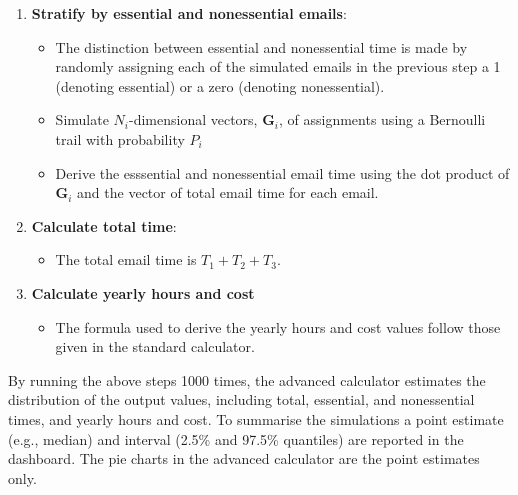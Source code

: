\documentclass[
  reportpaper,
  DIV=11,
  numbers=noendperiod]{scrartcl}
\providecommand{\tightlist}{%
  \setlength{\itemsep}{0pt}\setlength{\parskip}{0pt}}\usepackage{longtable,booktabs,array}
\begin{document}
\begin{enumerate}
\def\labelenumi{\arabic{enumi}.}
\setcounter{enumi}{4}
\tightlist
\item
  \textbf{Stratify by essential and nonessential emails}:

  \begin{itemize}
  \tightlist
  \item
    The distinction between essential and nonessential time is made by
    randomly assigning each of the simulated emails in the previous step
    a 1 (denoting essential) or a zero (denoting nonessential).
  \item
    Simulate \(N_i\)-dimensional vectors, \(\boldsymbol{G}_i\), of
    assignments using a Bernoulli trail with probability \(P_i\)
  \item
    Derive the esssential and nonessential email time using the dot
    product of \(\boldsymbol{G}_i\) and the vector of total email time
    for each email.
  \end{itemize}
\item
  \textbf{Calculate total time}:

  \begin{itemize}
  \tightlist
  \item
    The total email time is \(T_1 + T_2 + T_3\).
  \end{itemize}
\item
  \textbf{Calculate yearly hours and cost}

  \begin{itemize}
  \tightlist
  \item
    The formula used to derive the yearly hours and cost values follow
    those given in the standard calculator.
  \end{itemize}
\end{enumerate}

By running the above steps 1000 times, the advanced calculator estimates
the distribution of the output values, including total, essential, and
nonessential times, and yearly hours and cost. To summarise the
simulations a point estimate (e.g., median) and interval (2.5\% and
97.5\% quantiles) are reported in the dashboard. The pie charts in the
advanced calculator are the point estimates only.
\end{document}
